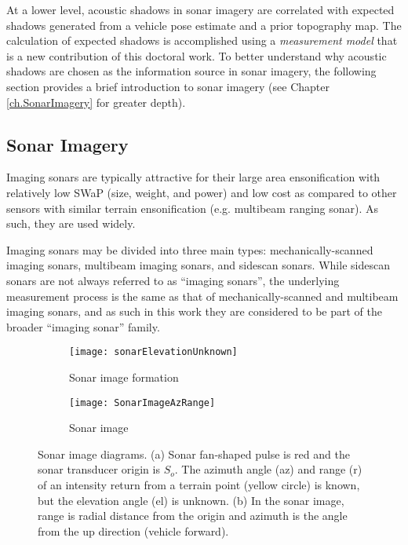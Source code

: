 At a lower level, acoustic shadows in sonar imagery are correlated with expected shadows generated from a vehicle pose estimate and a prior topography map.  
The calculation of expected shadows is accomplished using a \emph{measurement model} that is a new contribution of this doctoral work.
To better understand why acoustic shadows are chosen as the information source in sonar imagery, the following section provides a brief introduction to sonar imagery (see Chapter \ref{ch.SonarImagery} for greater depth).

\subsection{Sonar Imagery}
\label{intro.Sonar}

Imaging sonars are typically attractive for their large area ensonification with relatively low SWaP (size, weight, and power) and low cost as compared to other sensors with similar terrain ensonification (e.g. multibeam ranging sonar).
As such, they are used widely.

Imaging sonars may be divided into three main types: mechanically-scanned imaging sonars, multibeam imaging sonars, and sidescan sonars.
While sidescan sonars are not always referred to as ``imaging sonars'', the underlying measurement process is the same as that of mechanically-scanned and multibeam imaging sonars, and as such in this work they are considered to be part of the broader ``imaging sonar'' family.

\begin{figure}[!h]
	\centering
	\begin{subfigure}[b]{0.547\textwidth}
                \texttt{[image: sonarElevationUnknown]}
                \caption{Sonar image formation}
                \label{fig:sonarElevationUnknown}
  	\end{subfigure}
  	\centering
	\begin{subfigure}[b]{0.443\textwidth}
                \texttt{[image: SonarImageAzRange]}
                \caption{Sonar image}
                \label{fig:sonarImageRAz}
  	\end{subfigure}
	\caption{Sonar image diagrams. (a) Sonar fan-shaped pulse is red and the sonar transducer origin is $S_o$. The azimuth angle (az) and range (r) of an intensity return from a terrain point (yellow circle) is known, but the elevation angle (el) is unknown. (b) In the sonar image, range is radial distance from the origin and azimuth is the angle from the up direction (vehicle forward).}	
\end{figure}

